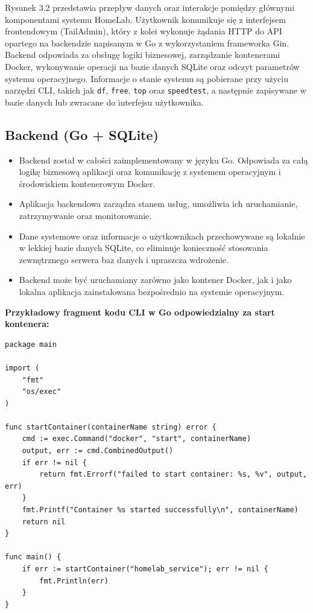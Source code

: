 Rysunek 3.2 przedstawia przepływ danych oraz interakcje pomiędzy głównymi komponentami systemu HomeLab. Użytkownik komunikuje się z interfejsem frontendowym (TailAdmin), który z kolei wykonuje żądania HTTP do API opartego na backendzie napisanym w Go z wykorzystaniem frameworka Gin. Backend odpowiada za obsługę logiki biznesowej, zarządzanie kontenerami Docker, wykonywanie operacji na bazie danych SQLite oraz odczyt parametrów systemu operacyjnego. Informacje o stanie systemu są pobierane przy użyciu narzędzi CLI, takich jak \texttt{df}, \texttt{free}, \texttt{top} oraz \texttt{speedtest}, a następnie zapisywane w bazie danych lub zwracane do interfejsu użytkownika.

\subsection{Backend (Go + SQLite)}
\begin{itemize}
    \item Backend został w całości zaimplementowany w języku Go. Odpowiada za całą logikę biznesową aplikacji oraz komunikację z systemem operacyjnym i środowiskiem kontenerowym Docker.
    \item Aplikacja backendowa zarządza stanem usług, umożliwia ich uruchamianie, zatrzymywanie oraz monitorowanie.
    \item Dane systemowe oraz informacje o użytkownikach przechowywane są lokalnie w lekkiej bazie danych SQLite, co eliminuje konieczność stosowania zewnętrznego serwera baz danych i upraszcza wdrożenie.
    \item Backend może być uruchamiany zarówno jako kontener Docker, jak i jako lokalna aplikacja zainstalowana bezpośrednio na systemie operacyjnym.
\end{itemize}

\textbf{Przykładowy fragment kodu CLI w Go odpowiedzialny za start kontenera:}
\begin{lstlisting}
package main

import (
    "fmt"
    "os/exec"
)

func startContainer(containerName string) error {
    cmd := exec.Command("docker", "start", containerName)
    output, err := cmd.CombinedOutput()
    if err != nil {
        return fmt.Errorf("failed to start container: %s, %v", output, err)
    }
    fmt.Printf("Container %s started successfully\n", containerName)
    return nil
}

func main() {
    if err := startContainer("homelab_service"); err != nil {
        fmt.Println(err)
    }
}
\end{lstlisting}


